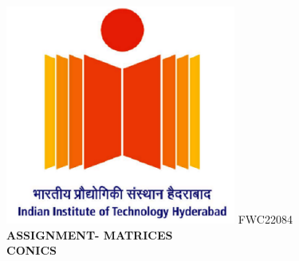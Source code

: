 \documentclass[8pt,a4paper]{report}
\begin{document}
\raggedright{\includegraphics[scale=0.8]{iith.png}} \hspace{12cm}\raggedleft FWC22084\vspace{8mm}\\ 

\centering \Large \textbf{ASSIGNMENT- MATRICES}
\\ \centering \Large \textbf{CONICS} \vspace{15mm}
\end{document}
